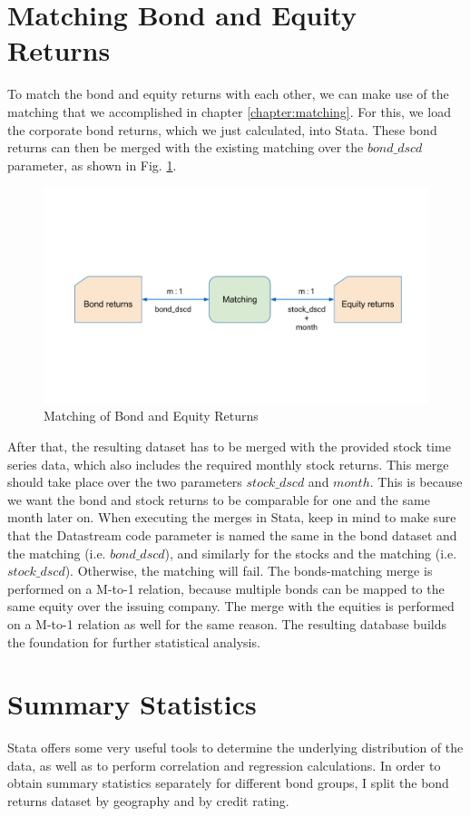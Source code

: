 \section{Matching Bond and Equity Returns}
To match the bond and equity returns with each other, we can make use of the matching that we accomplished in chapter \ref{chapter:matching}. For this, we load the corporate bond returns, which we just calculated, into Stata. These bond returns can then be merged with the existing matching over the $bond\_dscd$ parameter, as shown in Fig. \ref{fig:matching-returns}. 
\begin{figure}[h]
	\centering
	\includegraphics[trim={0 4.5cm 0 5cm},clip,width=1.0\linewidth]{figures/matching-returns.pdf}
	\caption{Matching of Bond and Equity Returns}
	\label{fig:matching-returns}
\end{figure}
After that, the resulting dataset has to be merged with the provided stock time series data, which also includes the required monthly stock returns. This merge should take place over the two parameters $stock\_dscd$ and $month$. This is because we want the bond and stock returns to be comparable for one and the same month later on. When executing the merges in Stata, keep in mind to make sure that the Datastream code parameter is named the same in the bond dataset and the matching (i.e. $bond\_dscd$), and similarly for the stocks and the matching (i.e. $stock\_dscd$). Otherwise, the matching will fail. The bonds-matching merge is performed on a M-to-1 relation, because multiple bonds can be mapped to the same equity over the issuing company. The merge with the equities is performed on a M-to-1 relation as well for the same reason. The resulting database builds the foundation for further statistical analysis. 

\section{Summary Statistics} \label{section:summary-statistics}
Stata offers some very useful tools to determine the underlying distribution of the data, as well as to perform correlation and regression calculations. In order to obtain summary statistics separately for different bond groups, I split the bond returns dataset by geography and by credit rating. 


